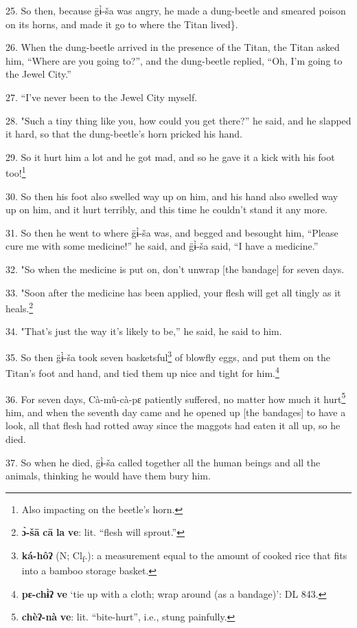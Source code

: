 25. So then, because g̈ɨ̀-ša was angry, he made a dung-beetle and smeared poison
on its horns, and made it go to where the Titan lived\}.

26. When the dung-beetle arrived in the presence of the Titan, the Titan asked
him, ``Where are you going to?'', and the dung-beetle replied, ``Oh, I'm going
to the Jewel City.''

27. ``I've never been to the Jewel City myself.

28. "Such a tiny thing like you, how could you get there?'' he said, and
he slapped it hard, so that the dung-beetle's horn pricked his hand.

29. So it hurt him a lot and he got mad, and so he gave it a kick with his foot
too!\footnote{Also impacting on the beetle's horn.}

30. So then his foot also swelled way up on him, and his hand also swelled way
up on him, and it hurt terribly, and this time he couldn't stand it any more.

31. So then he went to where g̈ɨ̀-ša was, and begged and besought him, ``Please
cure me with some medicine!'' he said, and g̈ɨ̀-ša said, ``I have a medicine.''

32. "So when the medicine is put on, don't unwrap [the bandage] for seven
days.

33. "Soon after the medicine has been applied, your flesh will get all
tingly as it heals.\footnote{\textbf{ɔ̀-šā} \textbf{cā} \textbf{la} \textbf{ve}: lit. ``flesh will sprout.''}

34. "That's just the way it's likely to be,'' he said, he said to him.

35. So then g̈ɨ̀-ša took seven basketsful\footnote{\textbf{ká-hôʔ} (N; Cl\textsubscript{f}.): a measurement equal to the amount of cooked rice that fits into a bamboo storage basket.} of blowfly eggs, and put them
on the Titan's foot and hand, and tied them up nice and tight for him.\footnote{\textbf{pɛ-chɨ̀ʔ} \textbf{ve} `tie up with a cloth; wrap around (as a bandage)': DL 843.}

36. For seven days, Cà-mû-cà-pɛ patiently suffered, no matter how much it
hurt\footnote{\textbf{chèʔ-nà} \textbf{ve}: lit. ``bite-hurt'', i.e., stung painfully.} him, and when the seventh day came and he opened up [the bandages] to
have a look, all that flesh had rotted away since the maggots had eaten it all
up, so he died.

37. So when he died, g̈ɨ̀-ša called together all the human beings and all the
animals, thinking he would have them bury him.

